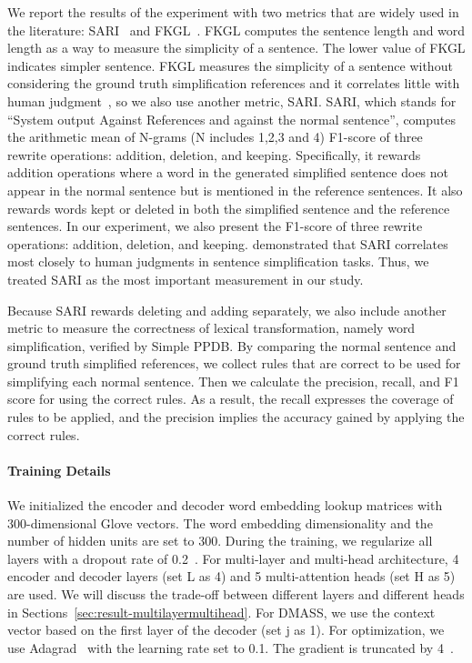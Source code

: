 \documentclass[11pt,a4paper]{article}
\begin{document}
We report the results of the experiment with two metrics that are widely used in the literature: SARI~\cite{xu2016optimizing} and FKGL~\cite{kincaid1975derivation}.
FKGL computes the sentence length and word length as a way to measure the simplicity of a sentence. The lower value of FKGL indicates simpler sentence.
FKGL measures the simplicity of a sentence without considering the ground truth simplification references and it correlates little with human judgment~\cite{xu2016optimizing}, so we also use another metric, SARI.
SARI, which stands for ``System output Against References and against the normal sentence'', computes the arithmetic mean of N-grams (N includes 1,2,3 and 4) F1-score of three rewrite operations: addition, deletion, and keeping.
Specifically, it rewards addition operations where a word in the generated simplified sentence does not appear in the normal sentence but is mentioned in the reference sentences. It also rewards words kept or deleted in both the simplified sentence and the reference sentences. In our experiment, we also present the F1-score of three rewrite operations: addition, deletion, and keeping.
\citet{xu2016optimizing} demonstrated that SARI correlates most closely to human judgments in sentence simplification tasks. Thus, we treated SARI as the most important measurement in our study.


Because SARI rewards deleting and adding separately, we also include another metric to measure the correctness of lexical transformation, namely word simplification, verified by Simple PPDB. By comparing the normal sentence and ground truth simplified references, we collect rules that are correct to be used for simplifying each normal sentence. Then we calculate the precision, recall, and F1 score for using the correct rules.  As a result, the recall expresses the coverage of rules to be applied, and the precision implies the accuracy gained by applying the correct rules.

\paragraph{Training Details}

We initialized the encoder and decoder word embedding lookup matrices with 300-dimensional Glove vectors\cite{pennington2014glove}. The word embedding dimensionality and the number of hidden units are set to 300. During the training, we regularize all layers with a dropout rate of 0.2~\cite{srivastava2014dropout}. For multi-layer and multi-head architecture, 4 encoder and decoder layers (set L as 4) and 5 multi-attention heads (set H as 5) are used. We will discuss the trade-off between different layers and different heads in Sections~\ref{sec:result-multilayermultihead}.
For DMASS, we use the context vector based on the first layer of the decoder (set j as 1).
For optimization, we use Adagrad~\cite{duchi2011adaptive} with the learning rate set to 0.1. The gradient is truncated by 4~\cite{pascanu2013difficulty}. 
\end{document}
